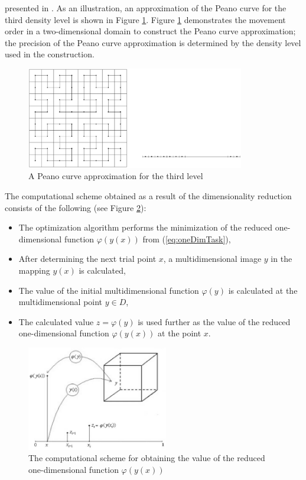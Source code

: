 \documentclass{aims}
\theoremstyle{definition}
\begin{document}
presented in \cite{strSergGO}. As an illustration, an approximation of the Peano curve
for the third density level is shown in Figure \ref{fig:peanoC}. Figure \ref{fig:peanoC}
demonstrates the movement order in a two-dimensional domain to construct the Peano
curve approximation; the precision of the Peano curve approximation is determined by the
density level used in the construction.
\begin{figure}
    \centering
    \includegraphics[width=0.85\textwidth]{pictures/peanoC.eps}
    \caption{A Peano curve approximation for the third level}
    \label{fig:peanoC}
\end{figure}

\par
The computational scheme obtained as a result of the dimensionality reduction consists of the following
(see Figure \ref{fig:peanoCUsage}):
\begin{itemize}
  \item The optimization algorithm performs the minimization of the reduced one-dimensional
  function \(\varphi(y(x))\) from (\ref{eq:oneDimTask}),
  \item After determining the next trial point \(x\), a multidimensional image \(y\) in the mapping \(y(x)\) is calculated,
  \item The value of the initial multidimensional function \(\varphi(y)\) is calculated at the multidimensional point \(y\in D\),
  \item The calculated value \(z=\varphi(y)\) is used further as the value of the reduced one-dimensional function \(\varphi(y(x))\) at the point \(x\).
\end{itemize}

\begin{figure}
    \centering
    \includegraphics[width=0.55\textwidth]{pictures/peanoCUsage.eps}
    \caption{The computational scheme for obtaining the value of the reduced one-dimensional function \(\varphi(y(x))\)}
    \label{fig:peanoCUsage}
\end{figure}
\end{document}
